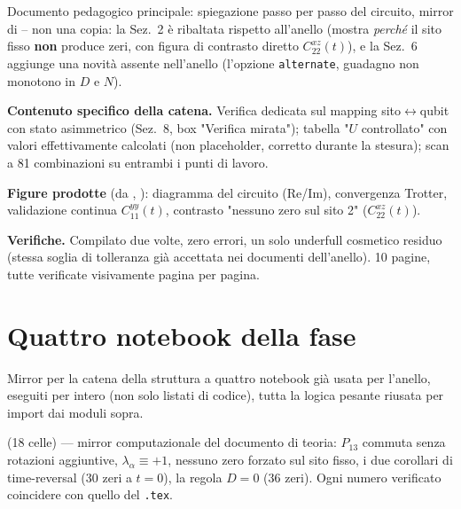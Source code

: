 \documentclass[11pt,a4paper]{article}
\begin{document}
\section*{\texttt{}}

Documento pedagogico principale: spiegazione passo per passo del circuito, mirror di
\texttt{} -- non una copia: la
Sez.~2 è ribaltata rispetto all'anello (mostra \emph{perché} il sito fisso \textbf{non} produce
zeri, con figura di contrasto diretto $C_{22}^{xz}(t)$), e la Sez.~6 aggiunge una novità assente
nell'anello (l'opzione \texttt{alternate}, guadagno non monotono in $D$ e $N$).

\textbf{Contenuto specifico della catena.} Verifica dedicata sul mapping sito$\leftrightarrow$qubit
con stato asimmetrico (Sez.~8, box "Verifica mirata"); tabella "$U$ controllato" con valori
effettivamente calcolati (non placeholder, corretto durante la stesura); scan a 81 combinazioni su
entrambi i punti di lavoro.

\textbf{Figure prodotte} (da \texttt{},
\texttt{}): diagramma del circuito
(Re/Im), convergenza Trotter, validazione continua $C_{11}^{yy}(t)$, contrasto "nessuno zero sul
sito 2" ($C_{22}^{xz}(t)$).

\textbf{Verifiche.} Compilato due volte, zero errori, un solo underfull cosmetico residuo (stessa
soglia di tolleranza già accettata nei documenti dell'anello). 10 pagine, tutte verificate
visivamente pagina per pagina.

\section*{Quattro notebook della fase}

Mirror per la catena della struttura a quattro notebook già usata per l'anello, eseguiti per
intero (non solo listati di codice), tutta la logica pesante riusata per import dai moduli sopra.

\textbf{\texttt{}} (18 celle) — mirror
computazionale del documento di teoria: $P_{13}$ commuta senza rotazioni aggiuntive, $\lambda_\alpha
\equiv+1$, nessuno zero forzato sul sito fisso, i due corollari di time-reversal (30 zeri a
$t=0$), la regola $D=0$ (36 zeri). Ogni numero verificato coincidere con quello del \texttt{.tex}.
\end{document}
